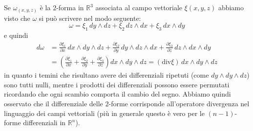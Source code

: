 \documentclass[italian,a4paper]{scrartcl}
\newcommand{\RR}{{\mathbb R}}
\renewcommand{\div}{\mathrm{div}}
\begin{document}
Se $\omega_{(x,y,z)}$ è la $2$-forma in $\RR^3$ associata al campo vettoriale
$\xi(x,y,z)$ abbiamo visto che $\omega$ si può scrivere nel modo seguente:
\[
   \omega = \xi_1\, dy \wedge dz + \xi_2\, dz\wedge dx +
   \xi_3\, dx\wedge dy
\] 
e quindi
\begin{align*}
  d \omega &= 
  \frac{\partial \xi_1}{\partial x}\, dx\wedge dy\wedge dz + 
  \frac{\partial \xi_2}{\partial y}\, dy\wedge dz\wedge dx +
  \frac{\partial \xi_3}{\partial z}\, dz\wedge dx\wedge dy \\
  & =
  \left(\frac{\partial \xi_1}{\partial x} +  
  \frac{\partial \xi_2}{\partial y} + 
  \frac{\partial \xi_3}{\partial z}\right)
  dx\wedge dy\wedge dz
  = (\div \xi)\, dx\wedge dy\wedge dz
\end{align*}
in quanto i temini che risultano avere dei differenziali ripetuti
(come $dy \wedge dy \wedge dz$) sono tutti nulli, mentre i prodotti
dei differenziali possono essere permutati ricordando che ogni scambio
comporta il cambio del segno. Abbiamo quindi osservato che il
differenziale delle $2$-forme corrisponde all'operatore divergenza nel
linguaggio dei campi vettoriali (più in generale questo è vero per le
$(n-1)$-forme differenziali in $\RR^n$).
\end{document}
